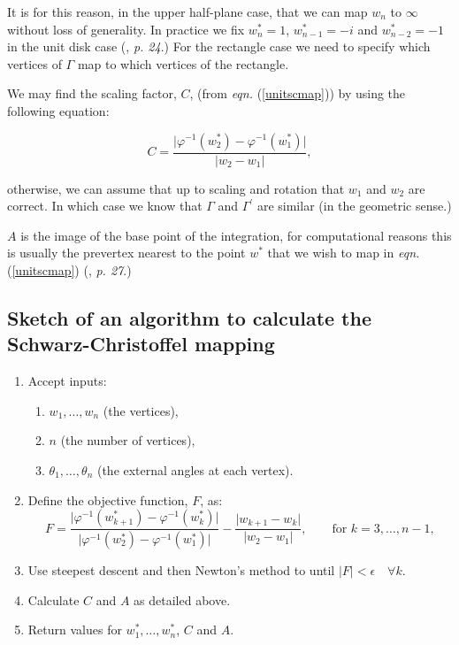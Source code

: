 \documentclass[a4paper,10pt]{amsart}
\newcommand{\sch}{Schwarz-Christoffel }
\newcommand{\eqn}[1]{\emph{eqn.} (\ref{#1})}
\newcommand{\phiinv}{\phi^{-1}}
\renewcommand{\phi}{\varphi}
\begin{document}
It is for this reason, in the upper half-plane case, that we can map $w_n$ to $\infty$ without loss of generality. In practice we fix $w^*_n=1$, $w^*_{n-1}=-i$ and $w^*_{n-2}=-1$ in the unit disk case (\cite{driscoll}, \emph{p. 24}.) For the rectangle case we need to specify which vertices of $\Gamma$ map to which vertices of the rectangle.

We may find the scaling factor, $C$, (from \eqn{unitscmap}) by using the following equation:

\begin{equation}
C=\frac{\vert \phiinv(w^*_2)-\phiinv(w^*_1)\vert}{\vert w_2 - w_1\vert},
\end{equation}

otherwise, we can assume that up to scaling and rotation that $w_1$ and $w_2$ are correct. In which case we know that $\Gamma$ and $\Gamma^\prime$ are similar (in the geometric sense.) 

$A$ is the image of the base point of the integration, for computational reasons this is usually the prevertex nearest to the point $w^*$ that we wish to map in \eqn{unitscmap}  (\cite{driscoll}, \emph{p. 27}.)


\subsection{Sketch of an algorithm to calculate the \sch mapping}
\label{algorithmsketch}
\begin{enumerate}
\item Accept inputs:
   \begin{enumerate} 
      \item $w_1,\dots,w_n$ (the vertices),
      \item $n$ (the number of vertices),
      \item $\theta_1,\dots,\theta_n$ (the external angles at each vertex).
   \end{enumerate}
\item Define the objective function, $F$, as:
 \begin{equation*}
F=\frac{\vert \phi^{-1}(w^*_{k+1}) -  \phi^{-1}(w^*_k) \vert}{\vert \phi^{-1}(w^*_2)-\phi^{-1}(w^*_1)\vert} - \frac{\vert w_{k+1} - w_k\vert}{\vert w_2 - w_1\vert}, \qquad \text{for } k=3,\dots,n-1,
 \end{equation*}
\item Use steepest descent and then Newton's method to until $\vert F\vert < \epsilon \quad \forall k$. \item Calculate $C$ and $A$ as detailed above.
\item Return values for $w^*_1,\dots,w^*_n$, $C$ and $A$.
\end{enumerate}
\end{document}

